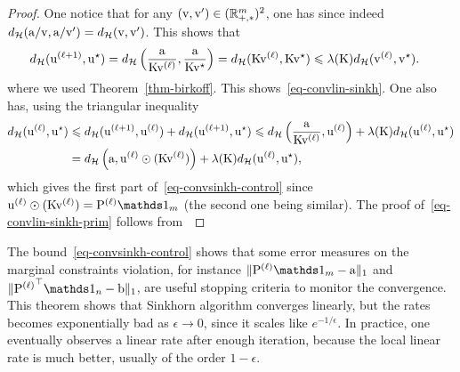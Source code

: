 \begin{proof}
	One notice that for any $(\mathrm{v},\mathrm{v}') \in (\mathbb{R}_{+,*}^m)^2$, one has 
	since indeed $d_{\mathcal{H}}(\mathrm{a}/\mathrm{v},\mathrm{a}/\mathrm{v}') = d_{\mathcal{H}}(\mathrm{v},\mathrm{v}')$.
	This shows that
	\begin{align*}
		d_{\mathcal{H}}(\mathrm{u}^{(\ell+1)},\mathrm{u}^\star) &= d_{\mathcal{H}}\left(  \frac{\mathrm{a}}{\mathrm{K} \mathrm{v}^{(\ell)}}, \frac{\mathrm{a}}{\mathrm{K} \mathrm{v}^\star}  \right) 
		= d_{\mathcal{H}}( \mathrm{K} \mathrm{v}^{(\ell)}, \mathrm{K} \mathrm{v}^\star ) \leqslant \lambda(\mathrm{K}) d_{\mathcal{H}}( \mathrm{v}^{(\ell)}, \mathrm{v}^\star ).
	\end{align*}
	where we used Theorem~\ref{thm-birkoff}. This shows~\eqref{eq-convlin-sinkh}.  One also has, using the triangular inequality
	\begin{align*}
		d_{\mathcal{H}}(\mathrm{u}^{(\ell)},\mathrm{u}^\star) &\leqslant d_{\mathcal{H}}(\mathrm{u}^{(\ell+1)},\mathrm{u}^{(\ell)}) + d_{\mathcal{H}}(\mathrm{u}^{(\ell+1)},\mathrm{u}^\star) 
		\leqslant d_{\mathcal{H}}\left(  \frac{\mathrm{a}}{\mathrm{K} \mathrm{v}^{(\ell)}},\mathrm{u}^{(\ell)}  \right) + \lambda(\mathrm{K}) d_{\mathcal{H}}(\mathrm{u}^{(\ell)},\mathrm{u}^\star) \\
		&= d_{\mathcal{H}}\left(  \mathrm{a},\mathrm{u}^{(\ell)} \odot  ( \mathrm{K} \mathrm{v}^{(\ell)} )  \right) + \lambda(\mathrm{K}) d_{\mathcal{H}}(\mathrm{u}^{(\ell)},\mathrm{u}^\star), 
	\end{align*}
	which gives the first part of~\eqref{eq-convsinkh-control} since 
	$\it{\uD} \odot  ( \K \it{\vD} ) = \it{\P}\ones_m$ (the second one being similar).
	The proof of~\eqref{eq-convlin-sinkh-prim} follows from~\cite[Lemma 3]{franklin1989scaling}
\end{proof}
 
The bound~\eqref{eq-convsinkh-control} shows that some error measures on the marginal constraints violation, for instance $\| \it{\P} \ones_m - \a \|_1$ and $\|\transp{\it{\P}} \ones_n - \b \|_1$, are useful stopping criteria to monitor the convergence. 
%
This theorem shows that Sinkhorn algorithm converges linearly, but the rates becomes exponentially bad as $\epsilon \rightarrow 0$, since it scales like $e^{-1/\epsilon}$. In practice, one eventually observes a linear rate after enough iteration, because the local linear rate is much better, usually of the order $1-\epsilon$. 

%

